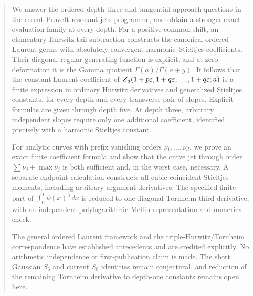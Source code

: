 \begin{abstract}
We answer the ordered-depth-three and tangential-approach questions in
the recent ProveIt resonant-jets programme, and obtain a stronger exact
evaluation family at every depth. For a positive common shift, an
elementary Hurwitz-tail subtraction constructs the canonical ordered
Laurent germs with absolutely convergent harmonic--Stieltjes
coefficients. Their diagonal regular generating function is explicit,
and at zero deformation it is the Gamma quotient
$\Gamma(a)/\Gamma(a+y)$. It follows that the constant Laurent coefficient
of $Z_d(1+p\eps,1+q\eps,\ldots,1+q\eps;a)$ is a finite expression
in ordinary Hurwitz derivatives and generalized Stieltjes constants,
for every depth and every transverse pair of slopes. Explicit formulas
are given through depth five. At depth three, arbitrary independent
slopes require only one additional coefficient, identified precisely
with a harmonic Stieltjes constant.

For analytic curves with prefix vanishing orders $\nu_1,\ldots,\nu_d$,
we prove an exact finite coefficient formula and show that the curve
jet through order $\sum\nu_j+\max\nu_j$ is both sufficient and, in the
worst case, necessary. A separate endpoint calculation constructs all
cubic coincident Stieltjes moments, including arbitrary argument
derivatives. The specified finite part of $\int_0^1\psi(x)^3\,dx$ is
reduced to one diagonal Tornheim third derivative, with an independent
polylogarithmic Mellin representation and numerical check.

The general ordered Laurent framework and the triple-Hurwitz/Tornheim
correspondence have established antecedents and are credited explicitly.
No arithmetic independence or first-publication claim is made. The
short Gaussian $S_6$ and current $S_8$ identities remain conjectural,
and reduction of the remaining Tornheim derivative to depth-one
constants remains open here.
\end{abstract}
